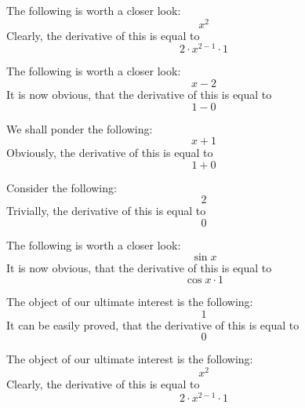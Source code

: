 \documentclass{article}
\begin{document}
The following is worth a closer look:
\begin{equation}
x ^{2 } 
\end{equation}
Clearly, the derivative of this is equal to
\begin{equation}
2 \cdot x ^{2 - 1 } \cdot 1 
\end{equation}

The following is worth a closer look:
\begin{equation}
x - 2 
\end{equation}
It is now obvious, that the derivative of this is equal to
\begin{equation}
1 - 0 
\end{equation}

We shall ponder the following:
\begin{equation}
x + 1 
\end{equation}
Obviously, the derivative of this is equal to
\begin{equation}
1 + 0 
\end{equation}

Consider the following:
\begin{equation}
2 
\end{equation}
Trivially, the derivative of this is equal to
\begin{equation}
0 
\end{equation}

The following is worth a closer look:
\begin{equation}
\sin x 
\end{equation}
It is now obvious, that the derivative of this is equal to
\begin{equation}
\cos x \cdot 1 
\end{equation}

The object of our ultimate interest is the following:
\begin{equation}
1 
\end{equation}
It can be easily proved, that the derivative of this is equal to
\begin{equation}
0 
\end{equation}

The object of our ultimate interest is the following:
\begin{equation}
x ^{2 } 
\end{equation}
Clearly, the derivative of this is equal to
\begin{equation}
2 \cdot x ^{2 - 1 } \cdot 1 
\end{equation}
\end{document}
